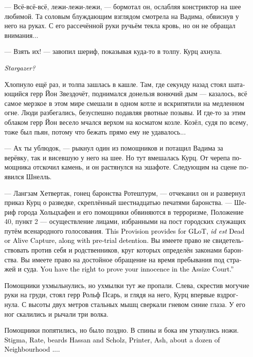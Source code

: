 \documentclass[a4paper,12pt,fleqn]{book}\usepackage{cooltooltips}\usepackage{polyglossia}\setdefaultlanguage[babelshorthands=true]{russian}\setotherlanguage{english}\defaultfontfeatures{Ligatures=TeX,Mapping=tex-text} \usepackage{xcolor}\definecolor{lightgray}{HTML}{bbbbbb}\color{lightgray}\newcommand{\ml}[3]{\textenglish{\textcolor{black}{#3}}}
\begin{document}
--- Всё-всё-всё, лежи-лежи-лежи, --- бормотал он, ослабляя констриктор на шее любимой.
Та соловым блуждающим взглядом смотрела на Вадима, обвиснув у него на руках.
С его рассечённой руки ручьём текла кровь, но он не обращал внимания...

--- Взять их! --- завопил шериф, показывая куда-то в толпу.
Курц ахнула.

\ml{$0$}
{<<Звездочёт?!>>}
{\textit{Stargazer?}}

Хлопнуло ещё раз, и толпа зашлась в кашле.
Там, где секунду назад стоял шатающийся герр Йон Звездочёт, поднимался донельзя вонючий дым --- казалось, всё самое мерзкое в этом мире смешали в одном котле и вскрипятили на медленном огне.
Люди разбегались, безуспешно подавляя рвотные позывы.
И где-то за этим облаком герр Йон весело мчался верхом на косматом козле.
Козёл, судя по всему, тоже был пьян, потому что бежать прямо ему не удавалось...

--- Ах ты ублюдок, --- рыкнул один из помощников и потащил Вадима за верёвку, так и висевшую у него на шее.
Но тут вмешалась Курц.
От черепа помощника отскочил камень, и он растянулся на эшафоте.
Следующим на сцене появился Шнелль.

--- Лангзам Хетвертак, гонец баронства Ротештурм, --- отчеканил он и развернул приказ Курц о разведке, скреплённый шестнадцатью печатями баронства.
--- Шериф города Хольцхафен и его помощники обвиняются в терроризме, Положение 40, пункт 2 --- осуществление лицами, избранными на пост городских служащих путём всенародного голосования.
\ml{$0$}
{Положение предусматривает ГЛоТ, то есть взятие живыми или мёртвыми, а также удержание под стражей до суда.}
{This Provision provides for GLoT, \textit{id est} Dead or Alive Capture, along with pre-trial detention.}
Вы имеете право не свидетельствовать против себя и родственников, круг которых определён законами баронства.
Вы имеете право на достойное обращение на время пребывания под стражей и суда.
\ml{$0$}
{Вы имеете право доказывать свою невиновность в суде присяжных.}
{You have the right to prove your innocence in the Assize Court.''}

Помощники ухмыльнулись, но ухмылки тут же пропали.
Слева, скрестив могучие руки на груди, стоял герр Рольф Псарь, и глядя на него, Курц впервые вздрогнула.
С высоты двух метров стальных мышц сверкали гневом синие глаза.
У его ног скалились и рычали три волка.

Помощники попятились, но было поздно.
В спины и бока им уткнулись ножи.
\ml{$0$}
{Стигма, Рате, бородачи Хассан и Шольц, Типограф, Ясень, ещё с десяток членов Соседства...}
{Stigma, Rate, beards Hassan and Scholz, Printer, Ash, about a dozen of Neighbourhood ....}
\end{document}
